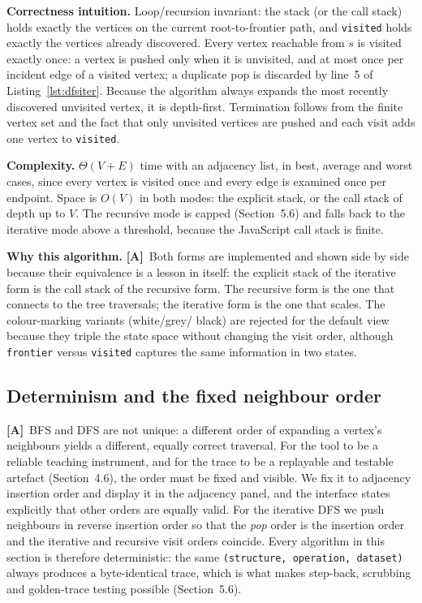 \documentclass[11pt,a4paper]{article}
\newcommand{\A}{\textcolor{asmc}{\textbf{[A]}}}     %
\newcommand{\ct}[1]{\texttt{#1}}
\begin{document}
\noindent\textbf{Correctness intuition.} Loop/recursion invariant: the stack (or the call stack)
holds exactly the vertices on the current root-to-frontier path, and \ct{visited} holds exactly the
vertices already discovered. Every vertex reachable from $s$ is visited exactly once: a vertex is
pushed only when it is unvisited, and at most once per incident edge of a visited vertex; a
duplicate pop is discarded by line~5 of Listing~\ref{lst:dfsiter}. Because the algorithm always
expands the most recently discovered unvisited vertex, it is depth-first. Termination follows
from the finite vertex set and the fact that only unvisited vertices are pushed and each visit
adds one vertex to \ct{visited}.

\smallskip
\noindent\textbf{Complexity.} $\Theta(V+E)$ time with an adjacency list, in best, average and
worst cases, since every vertex is visited once and every edge is examined once per endpoint.
Space is $O(V)$ in both modes: the explicit stack, or the call stack of depth up to $V$. The
recursive mode is capped (Section~5.6) and falls back to the iterative mode above a threshold,
because the JavaScript call stack is finite.

\smallskip
\noindent\textbf{Why this algorithm.} \A\ Both forms are implemented and shown side by side
because their equivalence is a lesson in itself: the explicit stack of the iterative form is the
call stack of the recursive form. The recursive form is the one that connects to the tree
traversals; the iterative form is the one that scales. The colour-marking variants (white/grey/
black) are rejected for the default view because they triple the state space without changing the
visit order, although \ct{frontier} versus \ct{visited} captures the same information in two
states.

\subsection{Determinism and the fixed neighbour order}

\A\ BFS and DFS are not unique: a different order of expanding a vertex's neighbours yields a
different, equally correct traversal. For the tool to be a reliable teaching instrument, and for
the trace to be a replayable and testable artefact (Section~4.6), the order must be fixed and
visible. We fix it to adjacency insertion order and display it in the adjacency panel, and the
interface states explicitly that other orders are equally valid. For the iterative DFS we push
neighbours in reverse insertion order so that the \emph{pop} order is the insertion order and the
iterative and recursive visit orders coincide. Every algorithm in this section is therefore
deterministic: the same \ct{(structure, operation, dataset)} always produces a byte-identical
trace, which is what makes step-back, scrubbing and golden-trace testing possible (Section~5.6).
\end{document}
